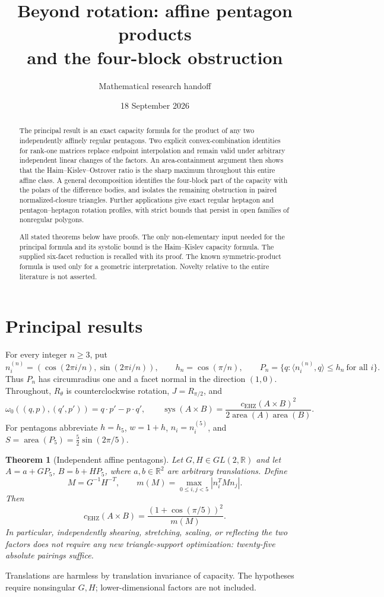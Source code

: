 \documentclass[11pt,a4paper]{article}
\title{Beyond rotation: affine pentagon products\\and the four-block obstruction}
\author{Mathematical research handoff}
\date{18 September 2026}
\newtheorem{theorem}{Theorem}[section]
\theoremstyle{definition}\newtheorem{definition}[theorem]{Definition}
\theoremstyle{remark}\newtheorem{remark}[theorem]{Remark}
\newcommand{\R}{\mathbb R}
\newcommand{\area}{\operatorname{area}}
\newcommand{\sys}{\operatorname{sys}}
\newcommand{\capc}{c_{\mathrm{EHZ}}}
\newcommand{\ip}[2]{\langle #1,#2\rangle}
\begin{document}
\maketitle
\begin{abstract}
The principal result is an exact capacity formula for the product of any two independently affinely regular pentagons. Two explicit convex-combination identities for rank-one matrices replace endpoint interpolation and remain valid under arbitrary independent linear changes of the factors. An area-containment argument then shows that the Haim--Kislev--Ostrover ratio is the sharp maximum throughout this entire affine class. A general decomposition identifies the four-block part of the capacity with the polars of the difference bodies, and isolates the remaining obstruction in paired normalized-closure triangles. Further applications give exact regular heptagon and pentagon--heptagon rotation profiles, with strict bounds that persist in open families of nonregular polygons.

All stated theorems below have proofs. The only non-elementary input needed for the principal formula and its systolic bound is the Haim--Kislev capacity formula. The supplied six-facet reduction is recalled with its proof. The known symmetric-product formula is used only for a geometric interpretation. Novelty relative to the entire literature is not asserted.
\end{abstract}
\tableofcontents

\section{Principal results}
For every integer $n\ge3$, put
\[
 n_i^{(n)}=(\cos(2\pi i/n),\sin(2\pi i/n)),\qquad
 h_n=\cos(\pi/n),\qquad
 P_n=\{q:\ip{n_i^{(n)}}q\le h_n\ \text{for all }i\}.
\]
Thus $P_n$ has circumradius one and a facet normal in the direction $(1,0)$. Throughout, $R_\theta$ is counterclockwise rotation, $J=R_{\pi/2}$, and
\[
 \omega_0((q,p),(q',p'))=q\cdot p'-p\cdot q',\qquad
 \sys(A\times B)=\frac{\capc(A\times B)^2}{2\area(A)\area(B)}.
\]
For pentagons abbreviate $h=h_5$, $w=1+h$, $n_i=n_i^{(5)}$, and $S=\area(P_5)=\frac52\sin(2\pi/5)$.

\begin{theorem}[Independent affine pentagons]\label{thm:affine}
Let $G,H\in GL(2,\R)$ and let $A=a+GP_5$, $B=b+HP_5$, where $a,b\in\R^2$ are arbitrary translations. Define
\[
 M=G^{-1}H^{-T},\qquad
 m(M)=\max_{0\le i,j<5}|n_i^T M n_j|.
\]
Then
\begin{equation}\label{eq:affine}
 \boxed{\displaystyle \capc(A\times B)=\frac{(1+\cos(\pi/5))^2}{m(M)}.}
\end{equation}
In particular, independently shearing, stretching, scaling, or reflecting the two factors does not require any new triangle-support optimization: twenty-five absolute pairings suffice.
\end{theorem}
Translations are harmless by translation invariance of capacity. The hypotheses require nonsingular $G,H$; lower-dimensional factors are not included.
\end{document}

